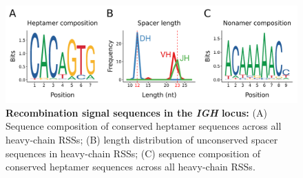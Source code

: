 	\begin{figure}
	\centering
	\includegraphics[width=\textwidth]{_Figures/png/nfu-rss-seqlogo-all}
	\caption[Recombination signal sequences in the \Nfu \textit{IGH} locus]{\textbf{Recombination signal sequences in the \Nfu \textit{IGH} locus:} (A) Sequence composition of conserved heptamer sequences across all \Nfu heavy-chain RSSs; (B) length distribution of unconserved spacer sequences in \Nfu heavy-chain RSSs; (C) sequence composition of conserved heptamer sequences across all \Nfu heavy-chain RSSs.}
	\label{fig:nfu-rss-seqlogo-all}
	\end{figure} %
	
